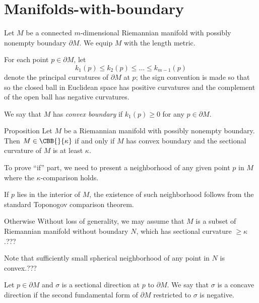 \section {Manifolds-with-boundary}\label{sec:with-bry}
Let $M$ be a connected $m$-dimensional Riemannian manifold with possibly nonempty boundary $\partial M$.
We equip $M$ with the length metric. 

For each point $p\in\partial M$,
let 
\[k_1(p)\le k_2(p)\le\dots\le k_{m-1}(p)\]
denote the principal curvatures
of $\partial M$ at $p$;
the sign convention is made so that
so the closed ball in Euclidean space has positive curvatures 
and the complement of the open ball has negative curvatures.

We say that $M$ has \emph{convex boundary} 
if $k_1(p)\ge 0$ for any $p\in\partial M$. 

\begin{thm}{Proposition}\label{prop:example-mnflds-with-bry:CBB}
Let $M$ be a Riemannian manifold with possibly nonempty boundary.
Then
$M\in\CBB{}{\kappa}$ 
if and only if $M$ has convex boundary 
and the sectional curvature of $M$ is at least $\kappa$.
\end{thm}

To prove ``if'' part, we need to present a neighborhood of any given point $p$ in $M$ where the $\kappa$-comparison holds.

If $p$ lies in the interior of $M$, 
the existence of such neighborhood 
follows from the standard Toponogov comparison theorem.

Otherwise 
Without loss of generality, we may assume that $M$ 
is a subset of Riemannian manifold without boundary $N$, 
which has sectional curvature $\ge \kappa$.???

Note that sufficiently small spherical neighborhood of 
any point in $N$ is convex.???\qeds


Let $p\in\partial M$ and $\sigma$ is a sectional direction at $p$ to $\partial M$.
We say that $\sigma$ is a concave direction if the second fundamental form of $\partial M$ restricted to $\sigma$ is negative.

